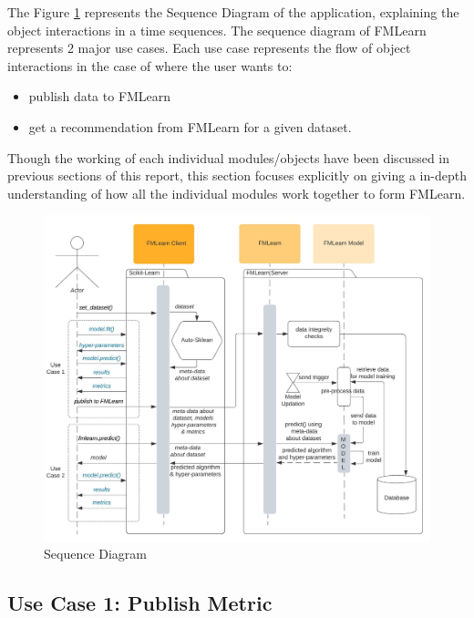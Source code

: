 The Figure \ref{sequence-diagram} represents the Sequence Diagram of the application, explaining the object interactions in a time sequences. The sequence diagram of FMLearn represents 2 major use cases. Each use case represents the flow of object interactions in the case of where the user wants to:
\begin{itemize}
    \item publish data to FMLearn
    \item get a recommendation from FMLearn for a given dataset.
\end{itemize}

Though the working of each individual modules/objects have been discussed in previous sections of this report, this section focuses explicitly on giving a in-depth understanding of how all the individual modules work together to form FMLearn.

\begin{figure}[t]
    \centering
    \includegraphics[width=15cm]{images/Sequence Diagram.jpeg}
    \caption{Sequence Diagram}
    \label{sequence-diagram}
\end{figure}

\subsection*{Use Case 1: Publish Metric}

